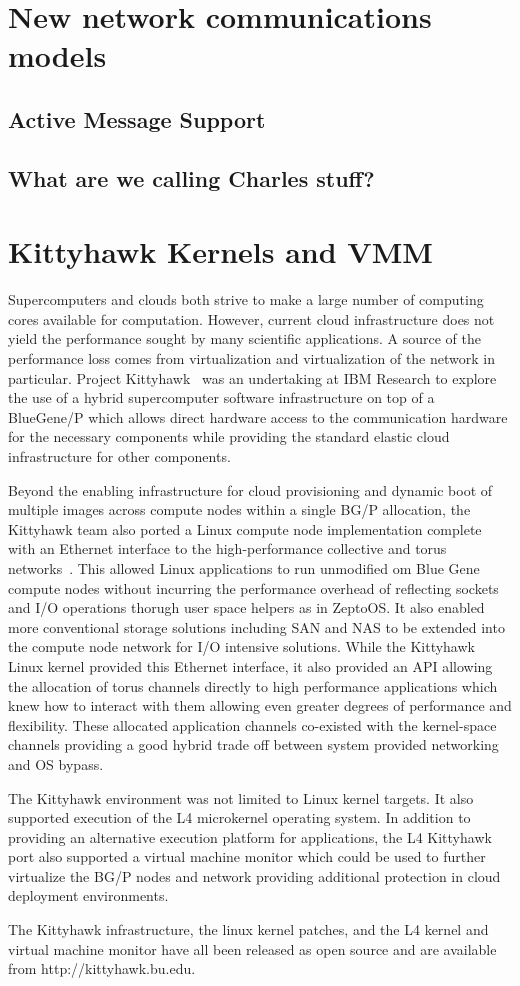 \section{New network communications models}
\subsection{Active Message Support}
\subsection{What are we calling Charles stuff?}
\section{Kittyhawk Kernels and VMM}

Supercomputers and clouds both strive to make a large number of 
computing cores available for computation. 
However, current cloud infrastructure does not yield the performance 
sought by many scientific applications. A source of the performance 
loss comes from virtualization and virtualization of the network in 
particular. 
Project Kittyhawk~\cite{kh-sciencecloud} was an undertaking at IBM Research 
to explore the use of a hybrid supercomputer software infrastructure
on top of a BlueGene/P which allows direct hardware access to the 
communication hardware for the necessary components while providing 
the standard elastic cloud infrastructure for other components.

Beyond the enabling infrastructure for cloud provisioning and dynamic
boot of multiple images across compute nodes within a single BG/P
allocation, the Kittyhawk team also ported a Linux compute node
implementation complete with an Ethernet interface to the high-performance
collective and torus networks~\cite{kh-systemsjournal}.  
This allowed Linux applications to run unmodified om Blue Gene compute 
nodes without incurring the performance 
overhead of reflecting sockets and I/O operations thorugh user space
helpers as in ZeptoOS.  It also enabled more conventional storage solutions
including SAN and NAS to be extended into the compute node network for
I/O intensive solutions.  While the Kittyhawk Linux kernel provided this
Ethernet interface, it also provided an API allowing the allocation of
torus channels directly to high performance applications which knew how to
interact with them allowing even greater degrees of performance and flexibility.
These allocated application channels co-existed with the kernel-space channels
providing a good hybrid trade off between system provided networking and
OS bypass.

The Kittyhawk environment was not limited to Linux kernel targets.  
It also supported execution of the L4 microkernel operating system.  
In addition to providing an alternative execution platform for applications,
the L4 Kittyhawk port also supported a virtual machine monitor which could
be used to further virtualize the BG/P nodes and network providing additional
protection in cloud deployment environments.

The Kittyhawk infrastructure, the linux kernel patches, and the L4 kernel
and virtual machine monitor have all been released as open source and are
available from http://kittyhawk.bu.edu.
